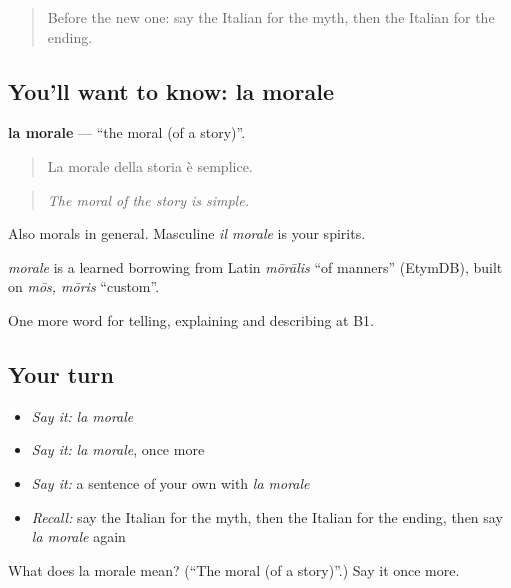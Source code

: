 \label{lesson:IT-C324-morale}



\begin{quote}
Before the new one: say the Italian for the myth, then the Italian for the ending.
\end{quote}

\subsection*{You'll want to know: la morale}
\textbf{la morale} — \textquotedblleft{}the moral (of a story)\textquotedblright{}.

\begin{quote}
La morale della storia è semplice.
\end{quote}

\begin{quote}
\emph{The moral of the story is simple.}
\end{quote}

Also morals in general. Masculine \emph{il morale} is your spirits.

\begin{cousinweb}
\emph{morale} is a learned borrowing from Latin \emph{mōrālis} \textquotedblleft{}of manners\textquotedblright{} (EtymDB), built on \emph{mōs, mōris} \textquotedblleft{}custom\textquotedblright{}.
\end{cousinweb}

\begin{grammarlens}[title={What you've built}]
One more word for telling, explaining and describing at B1.
\end{grammarlens}

\subsection*{Your turn}
\begin{itemize}
\raggedright
  \item \emph{Say it:} \emph{la morale}
  \item \emph{Say it:} \emph{la morale}, once more
  \item \emph{Say it:} a sentence of your own with \emph{la morale}
  \item \emph{Recall:} say the Italian for the myth, then the Italian for the ending, then say \emph{la morale} again
\end{itemize}

\begin{tcolorbox}[breakable,colback=teal!4,colframe=teal!35!black,title={Before you move on}]
What does la morale mean? (\textquotedblleft{}The moral (of a story)\textquotedblright{}.) Say it once more.
\end{tcolorbox}
